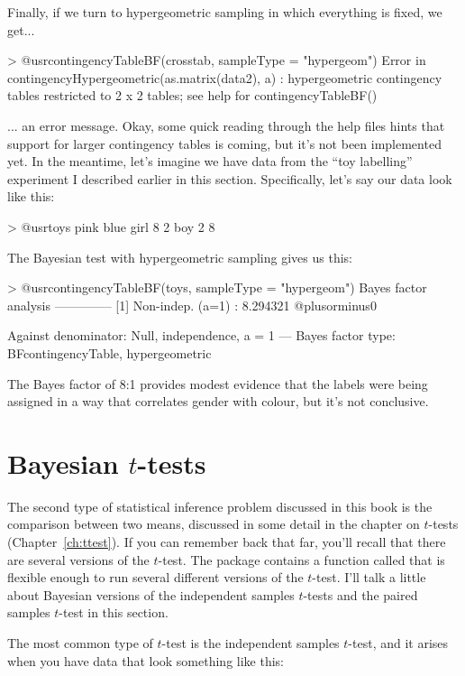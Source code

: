 Finally, if we turn to hypergeometric sampling in which everything is fixed, we get...
\begin{rblock1}
> @usr{contingencyTableBF(crosstab, sampleType = "hypergeom")}
Error in contingencyHypergeometric(as.matrix(data2), a) : 
  hypergeometric contingency tables restricted to 2 x 2 tables; see help for contingencyTableBF()
\end{rblock1}
... an error message. Okay, some quick reading through the help files hints that support for larger contingency tables is coming, but it's not been implemented yet. In the meantime, let's imagine we have data from the ``toy labelling'' experiment I described earlier in this section. Specifically, let's say our data look like this:
\begin{rblock1}
> @usr{toys}
     pink blue
girl    8    2
boy     2    8
\end{rblock1}
The Bayesian test with hypergeometric sampling gives us this:
\begin{rblock1}
> @usr{contingencyTableBF(toys, sampleType = "hypergeom")}
Bayes factor analysis
--------------
[1] Non-indep. (a=1) : 8.294321 @plusorminus0%

Against denominator:
  Null, independence, a = 1 
---
Bayes factor type: BFcontingencyTable, hypergeometric
\end{rblock1}
The Bayes factor of 8:1 provides modest evidence that the labels were being assigned in a way that correlates gender with colour, but it's not conclusive.




\section{Bayesian $t$-tests\label{sec:ttestbf}}

The second type of statistical inference problem discussed in this book is the comparison between two means, discussed in some detail in the chapter on $t$-tests (Chapter~\ref{ch:ttest}). If you can remember back that far, you'll recall that there are several versions of the $t$-test. The  package contains a function called  that is flexible enough to run several different versions of the $t$-test. I'll talk a little about Bayesian versions of the independent samples $t$-tests and the paired samples $t$-test in this section. 


The most common type of $t$-test is the independent samples $t$-test, and it arises when you have data that look something like this:

